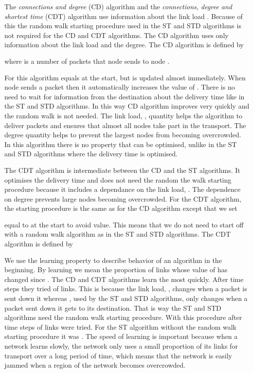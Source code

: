 \documentclass[runningheads]{llncs}
\begin{document}
The \emph{connections and degree} (CD) algorithm and the
\emph{connections, degree and shortest time} (CDT) algorithm use
information about the link load . Because of this the random
walk starting procedure used in the ST and STD algorithms is not
required for the CD and CDT algorithms. The CD algorithm uses only
information about the link load and the degree. The CD algorithm is
defined by

where  is a number of packets that node  sends to node
.

For this algorithm  equals  at the start, but  is
updated almost immediately. When node  sends a packet then it
automatically increases the value of . There is no need to
wait for information from the destination about the delivery time
like in the ST and STD algorithms. In this way CD algorithm improves
very quickly and the random walk is not needed. The link load,
, quantity helps the algorithm to deliver packets and ensures
that almost all nodes take part in the transport. The degree
quantity helps to prevent the largest nodes from becoming
overcrowded. In this algorithm there is no property that can be
optimised, unlike in the ST and STD algorithms where the delivery
time is optimised.

The CDT algorithm is intermediate between the CD and the ST
algorithms. It optimises the delivery time and does not need the
random the walk starting procedure because it includes a dependance
on the link load, . The dependence on degree prevents large
nodes becoming overcrowded. For the CDT algorithm, the starting
procedure is the same as for the CD algorithm except that we set

equal to  at the start to avoid  value. This means that we do not
need to start off with a random walk algorithm as in the ST and STD algorithms.
The CDT algorithm is defined by


We use the learning property to describe behavior of an algorithm in
the beginning. By learning we mean the proportion of links whose
value of  has changed since . The CD and CDT algorithms
learn the most quickly. After  time steps they tried  of
links. This is because the link load, , changes when a packet
is sent down it whereas , used by the ST and STD
algorithms, only changes when a packet sent down it gets to its
destination. That is way the ST and STD algorithms need the random
walk starting procedure. With this procedure after  time steps
 of links were tried. For the ST algorithm without the random
walk starting procedure it was . The speed of learning is
important because when a network learns slowly, the network only
uses a small proportion of its links for transport over a long
period of time, which means that the network is easily jammed when a
region of the network becomes overcrowded.
\end{document}
